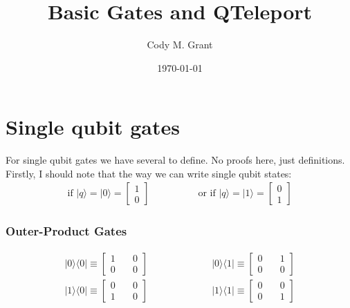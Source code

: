 \documentclass[preprint,aps,prd,nofootinbib,superscriptaddress]{revtex4-2}
\begin{document}
\title{\boldmath Basic Gates and QTeleport}


\author{Cody M. Grant}


\date{\today}


%
\maketitle
\newpage
 

\section{Single qubit gates}
%
For single qubit gates we have several to define. No proofs here, just definitions. Firstly, I should note that the way we can write single qubit states:
%
%
\begin{eqnarray} \label{eqn:outer_prods}
\text{if } |q \rangle = |0 \rangle = \begin{bmatrix}  1 \\ 0 \end{bmatrix}  
\quad \quad \quad \quad \quad
\text{or if } |q \rangle = |1 \rangle = \begin{bmatrix}  0 \\ 1 \end{bmatrix} 
\end{eqnarray}


\subsubsection{Outer-Product Gates}
%
\begin{eqnarray} \label{eqn:outer_prods}
|0 \rangle \langle 0| \equiv 
\begin{bmatrix}  
1 \quad & 0 \\ 
0 \quad & 0 
\end{bmatrix} 
\quad \quad &\quad& \quad \quad 
|0 \rangle \langle 1| \equiv 
\begin{bmatrix} 
0 \quad & 1 \\ 
0 \quad & 0 
\end{bmatrix} 
\nonumber \\
|1 \rangle \langle 0| \equiv 
\begin{bmatrix} 
0 \quad & 0 \\ 
1 \quad & 0 
\end{bmatrix} 
\quad \quad &\quad& \quad \quad 
|1 \rangle \langle 1| \equiv 
\begin{bmatrix} 
0 \quad & 0 \\ 
0 \quad & 1 
\end{bmatrix} 
\end{eqnarray}
\end{document}
